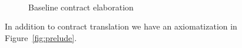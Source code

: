 \documentclass[preprint,nocopyrightspace,draft]{sigplanconf}
\begin{document}
\begin{figure}
\[\begin{array}{c}
\end{array}\]
\caption{Baseline contract elaboration}\label{fig:typing}
\end{figure}


In addition to contract translation we have an axiomatization in Figure~\ref{fig:prelude}.
\end{document}
